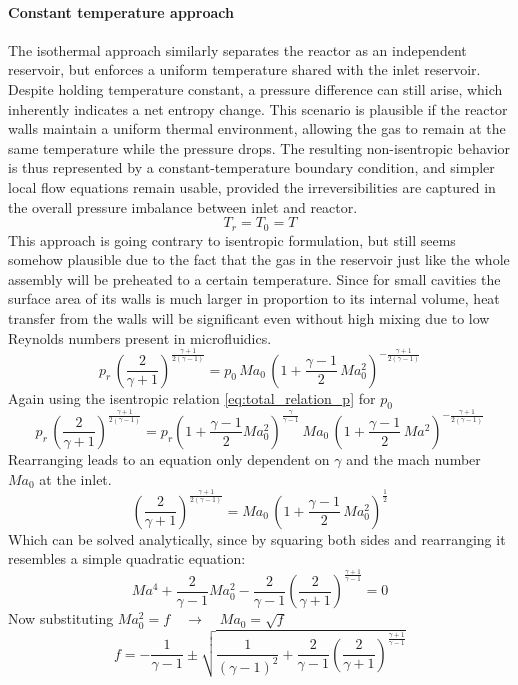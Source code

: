\paragraph{Constant temperature approach}
	The isothermal approach similarly separates the reactor as an independent reservoir, but enforces a uniform temperature shared with the inlet reservoir.
	Despite holding temperature constant, a pressure difference can still arise, which inherently indicates a net entropy change.
	This scenario is plausible if the reactor walls maintain a uniform thermal environment, allowing the gas to remain at the same temperature while the pressure drops.
	The resulting non-isentropic behavior is thus represented by a constant-temperature boundary condition, and simpler local flow equations remain usable, provided the irreversibilities are captured in the overall pressure imbalance between inlet and reactor. 
	$$
		T_r = T_0 = T
	$$
	This approach is going contrary to isentropic formulation, but still seems somehow plausible due to the fact that the gas in the reservoir just like the whole assembly will be preheated to a certain temperature.
	Since for small cavities the surface area of its walls is much larger in proportion to its internal volume, heat transfer from the walls will be significant even without high mixing due to low Reynolds numbers present in microfluidics.
	$$
		p_r\, \left(\frac{2}{\gamma+1}\right)^{\frac{\gamma+1}{2(\gamma-1)}}
		=  p_0\, Ma_0\,\left(1+\frac{\gamma-1}{2}\,Ma_0^2\right)^{-\frac{\gamma+1}{2(\gamma-1)}}
	$$
	Again using the isentropic relation \eqref{eq:total_relation_p} for $p_0$
	$$
		p_r\, \left(\frac{2}{\gamma+1}\right)^{\frac{\gamma+1}{2(\gamma-1)}}
		=  p_r \left(1 + \frac{\gamma - 1}{2}Ma_0^2 \right)^{\frac{\gamma}{\gamma - 1}}\, Ma_0\,\left(1+\frac{\gamma-1}{2}\,Ma^2\right)^{-\frac{\gamma+1}{2(\gamma-1)}}
	$$
	Rearranging leads to an equation only dependent on $\gamma$ and the mach number $Ma_0$ at the inlet.
	$$
		\left(\frac{2}{\gamma+1}\right)^{\frac{\gamma+1}{2(\gamma-1)}}
		=  Ma_0\,\left(1+\frac{\gamma-1}{2}\,Ma_0^2\right)^{\frac{1}{2}}
	$$
	Which can be solved analytically, since by squaring both sides and rearranging it resembles a simple quadratic equation:
	\begin{equation}
		Ma^4 + \frac{2}{\gamma - 1}Ma_0^2 - \frac{2}{\gamma -1}\left(\frac{2}{\gamma + 1}\right)^{\frac{\gamma + 1}{\gamma - 1}} = 0
	\end{equation}
	Now substituting $Ma_0^2 = f \quad \to \quad Ma_0 = \sqrt{f}$
	\begin{equation}
		f = -\frac{1}{\gamma - 1} \pm \sqrt{\frac{1}{(\gamma - 1)^2}
		+ \frac{2}{\gamma -1}\left(\frac{2}{\gamma + 1}\right)^{\frac{\gamma + 1}{\gamma - 1}}}
	\end{equation}
